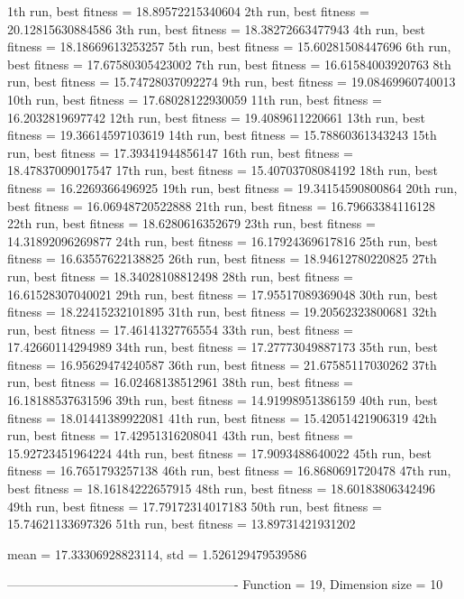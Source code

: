 1th run, best fitness = 18.89572215340604
2th run, best fitness = 20.12815630884586
3th run, best fitness = 18.38272663477943
4th run, best fitness = 18.18669613253257
5th run, best fitness = 15.60281508447696
6th run, best fitness = 17.67580305423002
7th run, best fitness = 16.61584003920763
8th run, best fitness = 15.74728037092274
9th run, best fitness = 19.08469960740013
10th run, best fitness = 17.68028122930059
11th run, best fitness = 16.2032819697742
12th run, best fitness = 19.4089611220661
13th run, best fitness = 19.36614597103619
14th run, best fitness = 15.78860361343243
15th run, best fitness = 17.39341944856147
16th run, best fitness = 18.47837009017547
17th run, best fitness = 15.40703708084192
18th run, best fitness = 16.2269366496925
19th run, best fitness = 19.34154590800864
20th run, best fitness = 16.06948720522888
21th run, best fitness = 16.79663384116128
22th run, best fitness = 18.6280616352679
23th run, best fitness = 14.31892096269877
24th run, best fitness = 16.17924369617816
25th run, best fitness = 16.63557622138825
26th run, best fitness = 18.94612780220825
27th run, best fitness = 18.34028108812498
28th run, best fitness = 16.61528307040021
29th run, best fitness = 17.95517089369048
30th run, best fitness = 18.22415232101895
31th run, best fitness = 19.20562323800681
32th run, best fitness = 17.46141327765554
33th run, best fitness = 17.42660114294989
34th run, best fitness = 17.27773049887173
35th run, best fitness = 16.95629474240587
36th run, best fitness = 21.67585117030262
37th run, best fitness = 16.02468138512961
38th run, best fitness = 16.18188537631596
39th run, best fitness = 14.91998951386159
40th run, best fitness = 18.01441389922081
41th run, best fitness = 15.42051421906319
42th run, best fitness = 17.42951316208041
43th run, best fitness = 15.92723451964224
44th run, best fitness = 17.9093488640022
45th run, best fitness = 16.7651793257138
46th run, best fitness = 16.8680691720478
47th run, best fitness = 18.16184222657915
48th run, best fitness = 18.60183806342496
49th run, best fitness = 17.79172314017183
50th run, best fitness = 15.74621133697326
51th run, best fitness = 13.89731421931202

mean = 17.33306928823114, std = 1.526129479539586

-------------------------------------------------------
Function = 19, Dimension size = 10

